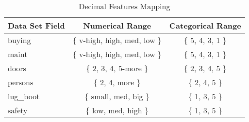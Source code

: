 \begin{table}[H]
\centering
\caption{Decimal Features Mapping}
\begin{tabular}{l|c|c}
\hline
\multicolumn{1}{c|}{\textbf{Data Set Field}} & \textbf{Numerical Range} & \multicolumn{1}{l}{\textbf{Categorical Range}} \\ \hline
buying                                       & $\lbrace$ v-high, high, med, low $\rbrace$    & $\lbrace$ 5, 4, 3, 1 $\rbrace$                                     \\
maint                                        & $\lbrace$ v-high, high, med, low $\rbrace$    & $\lbrace$ 5, 4, 3, 1 $\rbrace$                                    \\
doors                                        & $\lbrace$ 2, 3, 4, 5-more $\rbrace$            & $\lbrace$ 2, 3, 4, 5 $\rbrace$                                     \\
persons                                      & $\lbrace$ 2, 4, more $\rbrace$                & $\lbrace$ 2, 4, 5 $\rbrace$                                       \\
lug\_boot                                    & $\lbrace$ small, med, big $\rbrace$           & $\lbrace$ 1, 3, 5 $\rbrace$                                        \\
safety                                       & $\lbrace$ low, med, high $\rbrace$             & $\lbrace$ 1, 3, 5 $\rbrace$                                        \\ \hline
\end{tabular}
\end{table}